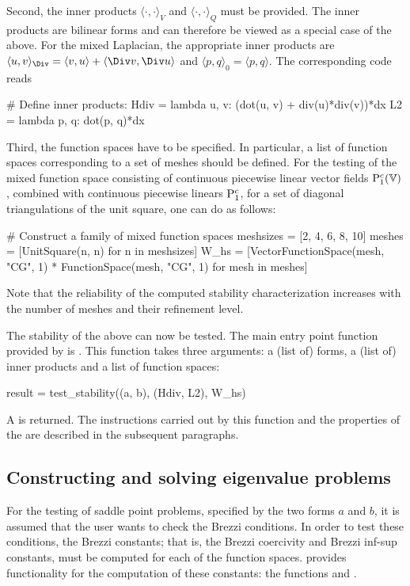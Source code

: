 Second, the inner products $\langle \cdot, \cdot \rangle_V$ and
$\langle \cdot, \cdot \rangle_Q$ must be provided. The inner products
are bilinear forms and can therefore be viewed as a special case of
the above. For the mixed Laplacian, the appropriate inner products are
$\langle u, v \rangle_{\Div} = \langle v, u \rangle + \langle \Div v,
\Div u \rangle$ and $\langle p, q \rangle_0 = \langle p, q \rangle$. The
corresponding code reads
\begin{python}
  # Define inner products:
  Hdiv = lambda u, v: (dot(u, v) + div(u)*div(v))*dx
  L2 = lambda p, q: dot(p, q)*dx
\end{python}

Third, the function spaces have to be specified. In particular, a list
of function spaces corresponding to a set of meshes should be defined.
For the testing of the mixed function space consisting of continuous
piecewise linear vector fields $\mathrm{P}^c_1(\mathbb{V})$, combined with
continuous piecewise linears $\mathrm{P}^c_1$, for a set of diagonal
triangulations of the unit square, one can do as follows:
\begin{python}
  # Construct a family of mixed function spaces
  meshsizes = [2, 4, 6, 8, 10]
  meshes = [UnitSquare(n, n) for n in meshsizes]
  W_hs = [VectorFunctionSpace(mesh, "CG", 1) * FunctionSpace(mesh, "CG", 1)
          for mesh in meshes]
\end{python}
Note that the reliability of the computed stability characterization
increases with the number of meshes and their refinement level.

The stability of the above can now be tested. The main entry point
function provided by \rognesascot{} is . This
function takes three arguments: a (list of) forms, a (list of) inner
products and a list of function spaces:
\begin{python}
  result = test_stability((a, b), (Hdiv, L2), W_hs)
\end{python}
A  is returned.  The instructions carried out
by this function and the properties of the 
are described in the subsequent paragraphs.

\subsection{Constructing and solving eigenvalue problems}

For the testing of saddle point problems, specified by the two forms
$a$ and $b$, it is assumed that the user wants to check the Brezzi
conditions. In order to test these conditions, the Brezzi constants;
that is, the Brezzi coercivity and Brezzi inf-sup constants, must be
computed for each of the function spaces. \rognesascot{} provides
functionality for the computation of these constants: the functions
 and
.

